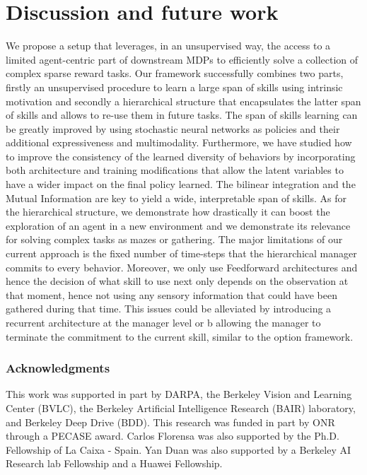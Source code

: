 \documentclass{article} %
\begin{document}
\section{Discussion and future work}
We propose a setup that leverages, in an unsupervised way, the access to a limited agent-centric part of downstream MDPs to efficiently solve a collection of complex sparse reward tasks. Our framework successfully combines two parts, firstly an unsupervised procedure to learn a large span of skills using intrinsic motivation and secondly a hierarchical structure that encapsulates the latter span of skills and allows to re-use them in future tasks. The span of skills learning can be greatly improved by using stochastic neural networks as policies and their additional expressiveness and multimodality. Furthermore, we have studied how to improve the consistency of the learned diversity of behaviors by incorporating both architecture and training modifications that allow the latent variables to have a wider impact on the final policy learned. The bilinear integration and the Mutual Information are key to yield a wide, interpretable span of skills. As for the hierarchical structure, we demonstrate how drastically it can boost the exploration of an agent in a new environment and we demonstrate its relevance for solving complex tasks as mazes or gathering. The major limitations of our current approach is the fixed number of time-steps that the hierarchical manager commits to every behavior. Moreover, we only use Feedforward architectures and hence the decision of what skill to use next only depends on the observation at that moment, hence not using any sensory information that could have been gathered during that time. This issues could be alleviated by introducing a recurrent architecture at the manager level or b allowing the manager to terminate the commitment to the current skill, similar to the option framework.

\subsubsection*{Acknowledgments}
This work was supported in part by DARPA, the Berkeley Vision and Learning Center (BVLC), the Berkeley Artificial Intelligence Research (BAIR) laboratory, and Berkeley Deep Drive (BDD). This research was funded in part by ONR through a PECASE award. Carlos Florensa was also supported by the Ph.D. Fellowship of La Caixa - Spain. Yan Duan was also supported by a Berkeley AI Research lab Fellowship and a Huawei Fellowship.
\end{document}
